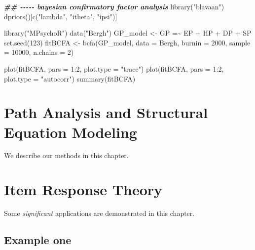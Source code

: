 \documentclass[
]{book}
\newenvironment{Shaded}{\begin{snugshade}}{\end{snugshade}}
\newcommand{\AttributeTok}[1]{\textcolor[rgb]{0.77,0.63,0.00}{#1}}
\newcommand{\DecValTok}[1]{\textcolor[rgb]{0.00,0.00,0.81}{#1}}
\newcommand{\DocumentationTok}[1]{\textcolor[rgb]{0.56,0.35,0.01}{\textbf{\textit{#1}}}}
\newcommand{\FunctionTok}[1]{\textcolor[rgb]{0.00,0.00,0.00}{#1}}
\newcommand{\NormalTok}[1]{#1}
\newcommand{\OtherTok}[1]{\textcolor[rgb]{0.56,0.35,0.01}{#1}}
\newcommand{\SpecialCharTok}[1]{\textcolor[rgb]{0.00,0.00,0.00}{#1}}
\newcommand{\StringTok}[1]{\textcolor[rgb]{0.31,0.60,0.02}{#1}}
\begin{document}
\begin{Shaded}
\begin{Highlighting}[]
\DocumentationTok{\#\# {-}{-}{-}{-}{-} bayesian confirmatory factor analysis}
\FunctionTok{library}\NormalTok{(}\StringTok{"blavaan"}\NormalTok{)}
\FunctionTok{dpriors}\NormalTok{()[}\FunctionTok{c}\NormalTok{(}\StringTok{"lambda"}\NormalTok{, }\StringTok{"itheta"}\NormalTok{, }\StringTok{"ipsi"}\NormalTok{)]}

\FunctionTok{library}\NormalTok{(}\StringTok{"MPsychoR"}\NormalTok{)}
\FunctionTok{data}\NormalTok{(}\StringTok{"Bergh"}\NormalTok{)}
\NormalTok{GP\_model }\OtherTok{\textless{}{-}} \StringTok{\textquotesingle{}GP =\textasciitilde{} EP + HP + DP + SP\textquotesingle{}}
\FunctionTok{set.seed}\NormalTok{(}\DecValTok{123}\NormalTok{)}
\NormalTok{fitBCFA }\OtherTok{\textless{}{-}} \FunctionTok{bcfa}\NormalTok{(GP\_model, }\AttributeTok{data =}\NormalTok{ Bergh, }\AttributeTok{burnin =} \DecValTok{2000}\NormalTok{, }\AttributeTok{sample =} \DecValTok{10000}\NormalTok{, }\AttributeTok{n.chains =} \DecValTok{2}\NormalTok{)}

\FunctionTok{plot}\NormalTok{(fitBCFA, }\AttributeTok{pars =} \DecValTok{1}\SpecialCharTok{:}\DecValTok{2}\NormalTok{, }\AttributeTok{plot.type =} \StringTok{"trace"}\NormalTok{)}
\FunctionTok{plot}\NormalTok{(fitBCFA, }\AttributeTok{pars =} \DecValTok{1}\SpecialCharTok{:}\DecValTok{2}\NormalTok{, }\AttributeTok{plot.type =} \StringTok{"autocorr"}\NormalTok{)}
\FunctionTok{summary}\NormalTok{(fitBCFA)}
\end{Highlighting}
\end{Shaded}

\hypertarget{path-analysis-and-structural-equation-modeling}{%
\chapter{Path Analysis and Structural Equation Modeling}\label{path-analysis-and-structural-equation-modeling}}

We describe our methods in this chapter.

\hypertarget{item-response-theory}{%
\chapter{Item Response Theory}\label{item-response-theory}}

Some \emph{significant} applications are demonstrated in this chapter.

\hypertarget{example-one}{%
\section{Example one}\label{example-one}}
\end{document}
